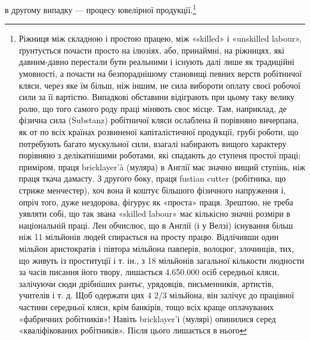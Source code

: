 в другому випадку — процесу ювелірної продукції.\footnote{
Ріжниця між складною і простою працею, між «skilled» і «unskilled
labour», ґрунтується почасти просто на ілюзіях, або, принаймні,
на ріжницях, які давним-давно перестали бути реальними і існують далі
лише як традиційні умовності, а почасти на безпораднішому становищі
певних верств робітничої кляси, через яке їм більш, ніж іншим, не сила
вибороти оплату своєї робочої сили за її вартістю. Випадкові обставини
відіграють при цьому таку велику ролю, що того самого роду праці міняють
своє місце. Там, наприклад, де фізична сила (Substanz) робітничої кляси
ослаблена й порівняно вичерпана, як от по всіх країнах розвиненої капіталістичної
продукції, грубі роботи, що потребують багато мускульної сили,
взагалі набирають вищого характеру порівняно з делікатнішими роботами,
які спадають до ступеня простої праці; приміром, праця bricklayer’à (муляра)
в Англії має значно вищий ступінь, ніж праця ткача дамасту.
З другого боку, праця fustian cutter (робітника, що стриже менчестер),
хоч вона й коштує більшого фізичного напруження і, опріч того, дуже нездорова,
фігурує як «проста» праця. Зрештою, не треба уявляти собі, що
так звана «skilled labour» має кількісно значні розміри в національній
праці. Лен обчислює, що в Англії (і у Велзі) існування більш ніж
11 мільйонів людей спирається на просту працю. Відлічивши один мільйон
аристократів і півтора мільйона павперів, волоцюг, злочинців, тих, що
живуть із проституції і т. ін., з 18 мільйонів загальної кількости людности
за часів писання його твору, лишається 4.650.000 осіб середньої
кляси, залічуючи сюди дрібніших рантьє, урядовців, письменників,
артистів, учителів і т. д. Щоб одержати цих 4 2/3 мільйона, він залічує до
працівної частини середньої кляси, крім банкірів, тощо всіх краще оплачуваних
«фабричних робітників»! Навіть bricklayer’і (мулярі) опинилися
серед «кваліфікованих робітників». Після цього лишається в нього
}

